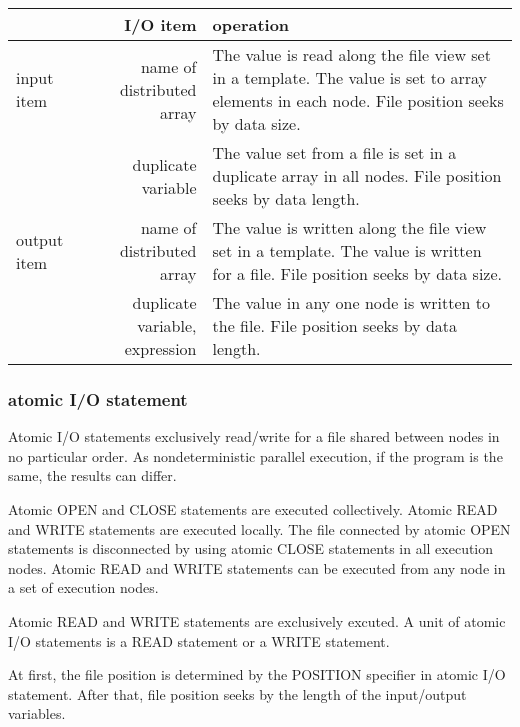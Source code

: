    \begin{table}[h]
    \begin{center}
     \begin{tabular}{l|r|p{80mm}}
      \hline
      \multicolumn{1}{c}{ }  & {\bf I/O item} & {\bf operation} \\ \hline
      input item & name of distributed array & The value is read along
	      the file view set in a template. The value is set to array
	      elements in each node.
	      File position seeks by data size.\\
      \cline{2-3}
      & duplicate variable &  The value set from a file is set in a
	      duplicate array in all nodes. File position seeks by
	      data length. \\ \hline
      output item & name of distributed array & The value is written
	      along the file view set in a template. The value is
	      written for a file.
	      File position seeks by data size.\\
      \cline{2-3}
      & duplicate variable, expression & The value in any one node is
	      written to the file.  File position seeks by data
	      length. \\ \hline
      \end{tabular}
     \end{center}
    \label{tb:aaa}
   \end{table}

   \subsubsection{atomic I/O statement}

   Atomic I/O statements exclusively read/write for a file shared
   between nodes in no particular order.
   As nondeterministic parallel execution, if the program is the same,
   the results can differ.

   Atomic OPEN and CLOSE statements are executed collectively. Atomic
   READ and WRITE statements are executed locally.
   The file connected by atomic OPEN statements is disconnected by using
   atomic CLOSE statements in all execution nodes.
   Atomic READ and WRITE statements can be executed from any node in a
   set of execution nodes.

   Atomic READ and WRITE statements are exclusively excuted.
   A unit of atomic I/O statements is a READ statement or a WRITE
   statement.

   At first, the file position is determined by the POSITION specifier in
   atomic I/O statement.
   After that, file position seeks by the length of the input/output
   variables.


